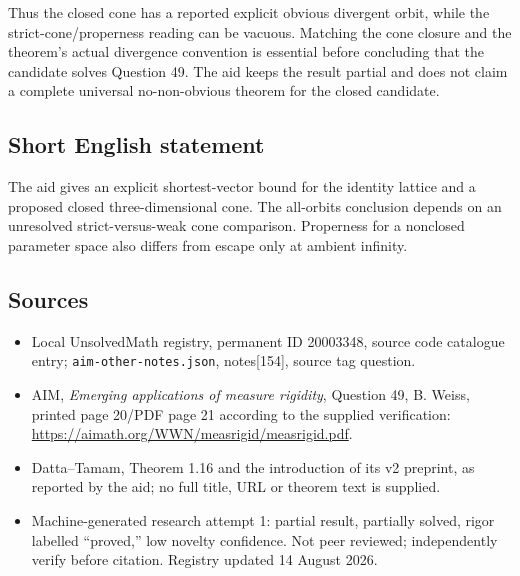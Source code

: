 \documentclass[11pt]{article}
\begin{document}
Thus the closed cone has a reported explicit obvious divergent orbit, while the strict-cone/properness reading can be vacuous. Matching the cone closure and the theorem's actual divergence convention is essential before concluding that the candidate solves Question 49. The aid keeps the result partial and does not claim a complete universal no-non-obvious theorem for the closed candidate.
\subsection{Short English statement}
The aid gives an explicit shortest-vector bound for the identity lattice and a proposed closed three-dimensional cone. The all-orbits conclusion depends on an unresolved strict-versus-weak cone comparison. Properness for a nonclosed parameter space also differs from escape only at ambient infinity.
\subsection{Sources}
\begin{itemize}
\item Local UnsolvedMath registry, permanent ID 20003348, source code catalogue entry; \texttt{aim-other-notes.json}, notes[154], source tag question.
\item AIM, \emph{Emerging applications of measure rigidity}, Question 49, B. Weiss, printed page 20/PDF page 21 according to the supplied verification: \url{https://aimath.org/WWN/measrigid/measrigid.pdf}.
\item Datta--Tamam, Theorem 1.16 and the introduction of its v2 preprint, as reported by the aid; no full title, URL or theorem text is supplied.
\item Machine-generated research attempt 1: partial result, partially solved, rigor labelled ``proved,'' low novelty confidence. Not peer reviewed; independently verify before citation. Registry updated 14 August 2026.
\end{itemize}
\end{document}
